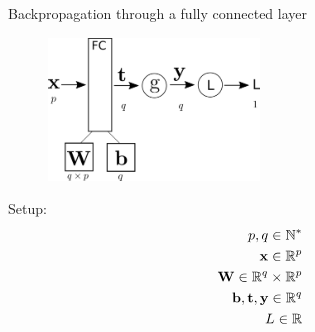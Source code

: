 \documentclass[xcolor=pdftex,dvipsnames,table,mathserif]{beamer}
\begin{document}




\begin{frame}{Backpropagation through a fully connected layer}
\begin{figure}
\includegraphics[width=0.5\textwidth]{../graphics/bp_fc.png}
\end{figure}

Setup:
\begin{eqnarray*}
p, q \in \mathbb{N}^*\\
\mathbf{x} \in \mathbb{R}^p \\
\mathbf{W} \in \mathbb{R}^q \times \mathbb{R}^p \\
\mathbf{b}, \mathbf{t}, \mathbf{y} \in \mathbb{R}^q \\
L \in \mathbb{R}
\end{eqnarray*}

\end{frame}
\end{document}
